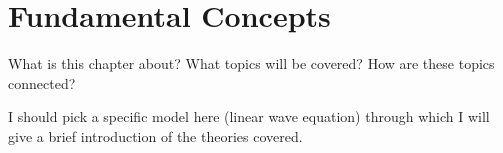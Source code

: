 %
\chapter{Fundamental Concepts}
\label{chapter:fundamentalconcepts}
%

What is this chapter about? What topics will be covered? How are these topics
connected?

I should pick a specific model here (linear wave equation) through which I will give a brief introduction
of the theories covered.







